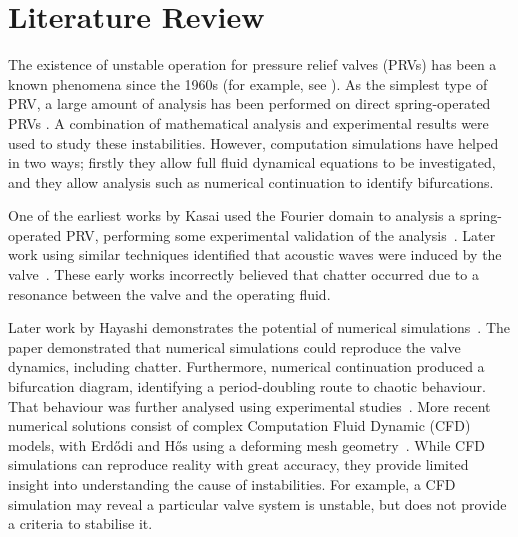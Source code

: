 \section{Literature Review}

\vspace{-10pt}

The existence of unstable operation for pressure relief valves (PRVs) has been a known phenomena since the 1960s (for example, see \cite{Kasai1968OnSystem}).
As the simplest type of  PRV, a large amount of analysis has been performed on direct spring-operated PRVs \cite{Kasai1968OnSystem,Thomann1976OscillationsPipe,Hayashi1995InstabilityCircuit,Darby2013TheModel,Bazso2013AnValve,Erdodi2017PredictionModelling,Hos2015ModelPipe,Hos2017DynamicRecommendations}. A combination of mathematical analysis and experimental results were used to study these instabilities. However, computation simulations have helped  in two ways; firstly they allow full fluid dynamical equations
to be investigated, and they allow analysis such as numerical continuation to identify bifurcations.

One of the earliest works by Kasai used the Fourier domain to analysis a spring-operated PRV, performing some experimental validation of the analysis~\cite{Kasai1968OnSystem}. Later work using similar techniques identified that acoustic waves were induced by the valve~\cite{Thomann1976OscillationsPipe}. These early works incorrectly believed that chatter occurred due to a resonance between the valve and the operating fluid.

Later work by Hayashi demonstrates the potential of numerical simulations~\cite{Hayashi1995InstabilityCircuit}. The paper demonstrated that numerical simulations could reproduce the valve dynamics, including chatter. Furthermore, numerical continuation produced a bifurcation diagram, identifying a period-doubling route to chaotic behaviour. That behaviour was further analysed using experimental studies~\cite{Bazso2013AnValve}. More recent numerical solutions consist of complex Computation Fluid Dynamic (CFD) models, with Erd\H{o}di and H\H{o}s using a deforming mesh geometry~\cite{Erdodi2017PredictionModelling}. While CFD simulations can reproduce reality with great accuracy, they provide limited insight into understanding the cause of instabilities. For example, a CFD simulation may reveal a particular valve system is unstable, but does not provide a criteria to stabilise it.


